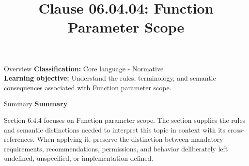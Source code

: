 \documentclass[10pt,letterpaper]{article}
\title{Clause 06.04.04: Function Parameter Scope}
\author{}
\date{}
\begin{document}
\maketitle
\begin{CornellOverviewBox}{Overview}
\textbf{Classification:} Core language - Normative\\[2pt]
\textbf{Learning objective:} Understand the rules, terminology, and semantic consequences associated with Function parameter scope.
\end{CornellOverviewBox}\begin{CornellSummaryBox}{Summary}
{\sffamily\bfseries\color{Accent} Summary}\par\vspace{3pt}Section 6.4.4 focuses on Function parameter scope. The section supplies the rules and semantic distinctions needed to interpret this topic in context with its cross-references. When applying it, preserve the distinction between mandatory requirements, recommendations, permissions, and behavior deliberately left undefined, unspecified, or implementation-defined.
\end{CornellSummaryBox}
\end{document}

